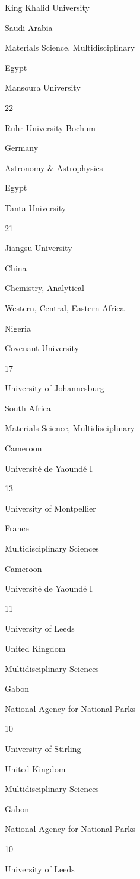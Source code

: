 \documentclass[12pt,twoside]{report}
\begin{document}
{King Khalid University }

{Saudi Arabia }

{Materials Science, Multidisciplinary}

{Egypt }

{Mansoura University }

{22}

{Ruhr University Bochum }

{Germany }

{Astronomy \& Astrophysics }

{Egypt }

{Tanta University }

{21}

{Jiangsu University }

{China }

{Chemistry, Analytical }

Western, Central, Eastern Africa

{Nigeria }

{Covenant University }

{17}

{University of Johannesburg }

{South Africa }

{Materials Science, Multidisciplinary}

{Cameroon }

{Université de Yaoundé I }

{13}

{University of Montpellier }

{France }

{Multidisciplinary Sciences }

{Cameroon }

{Université de Yaoundé I }

{11}

{University of Leeds }

{United Kingdom}

{Multidisciplinary Sciences }

{Gabon }

{National Agency for National Parks}

{10}

{University of Stirling }

{United Kingdom}

{Multidisciplinary Sciences }

{Gabon }

{National Agency for National Parks}

{10}

{University of Leeds }
\end{document}
